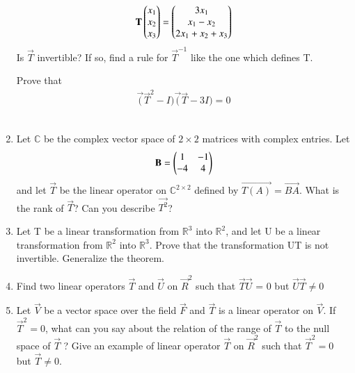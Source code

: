 \begin{enumerate}[label=\thesubsection.\arabic*.,ref=\thesubsection.\theenumi]
\begin{align*}
	\mathbf{T}\begin{pmatrix}x_1\\x_2\\x_3\end{pmatrix}=\begin{pmatrix}3x_1\\x_1-x_2\\2x_1+x_2+x_3\end{pmatrix}
\end{align*}
Is $\vec{T}$ invertible? If so, find a rule for $\vec{T}^{-1}$ like the one which defines T.
%
\\
\solution

Prove that
\begin{align}
    \vec(\vec{T}^{2}-I)\vec(\vec{T}-3I)=0
\end{align}
%
\\
\solution

%
\item Let $\mathbb{C}$ be the complex vector space of $2\times2$ matrices with complex entries. Let
\begin{align}
	\mathbf{B} = \begin{pmatrix}1 & -1 \\ -4 & 4\end{pmatrix}
\end{align}
and let $\vec{T}$ be the linear operator on $\mathbb{C}^{2\times2}$  defined by $\vec{T(A)} = \vec{BA}$. What is the rank of $\vec{T}$? Can you describe $\vec{T^2}$?   
%
\\
\solution

%
\item Let T be a linear transformation from $\mathbb{R}^3$ into $\mathbb{R}^2$, and let U be a linear transformation from $\mathbb{R}^2$ into $\mathbb{R}^3$. Prove that the transformation UT is not invertible. Generalize the theorem.
%
\\
\solution

%
\item Find two linear operators $\vec{T}$ and $\vec{U}$ on $\vec{R}^2$ such that $\vec{T}\vec{U}$ = 0 but $\vec{U}\vec{T} \neq 0$
%
\\
\solution

%
\item Let $\vec{V}$ be a vector space over the field $\vec{F}$ and $\vec{T}$ is a linear operator on $\vec{V}$. If $\vec{T}^2=0$, what can you say about the relation of the range of $\vec{T}$ to the null space of $\vec{T}$ ?
Give an example of linear operator $\vec{T}$ on $\vec{R}^2$ such that $\vec{T}^2=0$ but $\vec{T}\ne0$.
%
\\
\solution



\end{enumerate}
